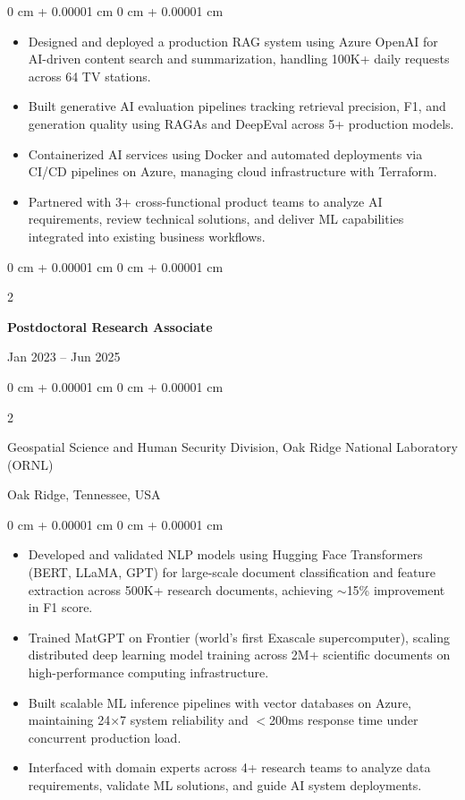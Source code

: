 \documentclass[10pt, letterpaper]{article}
\newenvironment{highlights}{
    \begin{itemize}[
        topsep=0.10 cm,
        parsep=0.10 cm,
        partopsep=0pt,
        itemsep=0pt,
        leftmargin=0 cm + 10pt
    ]
}{
    \end{itemize}
} %
\newenvironment{onecolentry}{
    \begin{adjustwidth}{
        0 cm + 0.00001 cm
    }{
        0 cm + 0.00001 cm
    }
}{
    \end{adjustwidth}
} %
\newenvironment{twocolentry}[2][]{
    \onecolentry
    \def\secondColumn{#2}
    \setcolumnwidth{\fill, 4.5 cm}
    \begin{paracol}{2}
}{
    \switchcolumn \raggedleft \secondColumn
    \end{paracol}
    \endonecolentry
} %
\begin{document}
    \begin{onecolentry}
        \begin{highlights}
            \item Designed and deployed a production RAG system using Azure OpenAI for AI-driven content search and summarization, handling 100K+ daily requests across 64 TV stations.
            \item Built generative AI evaluation pipelines tracking retrieval precision, F1, and generation quality using RAGAs and DeepEval across 5+ production models.
            \item Containerized AI services using Docker and automated deployments via CI/CD pipelines on Azure, managing cloud infrastructure with Terraform.
            \item Partnered with 3+ cross-functional product teams to analyze AI requirements, review technical solutions, and deliver ML capabilities integrated into existing business workflows.
        \end{highlights}
    \end{onecolentry}

\vspace{1mm}

    \begin{twocolentry}{Jan 2023 -- Jun 2025}
        \textbf{Postdoctoral Research Associate}
    \end{twocolentry}
    \begin{twocolentry}{Oak Ridge, Tennessee, USA}
        Geospatial Science and Human Security Division, Oak Ridge National Laboratory (ORNL)
    \end{twocolentry}
    \vspace{0.10 cm}
    \begin{onecolentry}
        \begin{highlights}
            \item Developed and validated NLP models using Hugging Face Transformers (BERT, LLaMA, GPT) for large-scale document classification and feature extraction across 500K+ research documents, achieving $\sim$15\% improvement in F1 score.
            \item Trained MatGPT on Frontier (world's first Exascale supercomputer), scaling distributed deep learning model training across 2M+ scientific documents on high-performance computing infrastructure.
            \item Built scalable ML inference pipelines with vector databases on Azure, maintaining 24×7 system reliability and $<$200ms response time under concurrent production load.
            \item Interfaced with domain experts across 4+ research teams to analyze data requirements, validate ML solutions, and guide AI system deployments.
        \end{highlights}
    \end{onecolentry}
\end{document}
